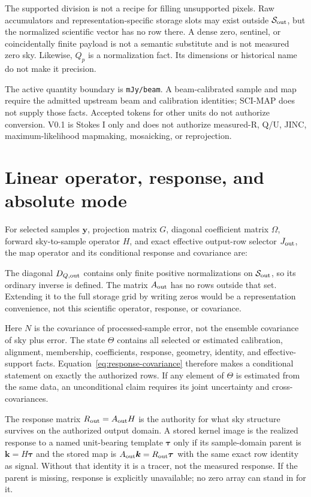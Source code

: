 \documentclass[10pt]{article}
\newcommand{\code}[1]{\nolinkurl{#1}}
\begin{document}
\SCIMapObservationEquations

The supported division is not a recipe for filling unsupported pixels. Raw
accumulators and representation-specific storage slots may exist outside
\(\mathcal S_{\rm out}\), but the normalized scientific vector has no row
there. A dense zero, sentinel, or coincidentally finite payload is not a
semantic substitute and is not measured zero sky. Likewise, \(Q_p\) is a
normalization fact. Its dimensions or historical name do not make it
precision.

The active quantity boundary is \code{mJy/beam}. A beam-calibrated sample and
map require the admitted upstream beam and calibration identities; SCI-MAP
does not supply those facts. Accepted tokens for other units do not authorize
conversion. V0.1 is Stokes I only and does not authorize measured-R,
Q/U, JINC, maximum-likelihood mapmaking, mosaicking, or reprojection.

\clearpage
\section{Linear operator, response, and absolute mode}

For selected samples \(\boldsymbol y\), projection matrix \(G\), diagonal
coefficient matrix \(\Omega\), forward sky-to-sample operator \(H\), and exact
effective output-row selector \(J_{\rm out}\), the map operator and its
conditional response and covariance are:

\SCIMapOperatorEquations

The diagonal \(D_{Q,{\rm out}}\) contains only finite positive normalizations
on \(\mathcal S_{\rm out}\), so its ordinary inverse is defined. The matrix
\(A_{\rm out}\) has no rows outside that set. Extending it to the full storage
grid by writing zeros would be a representation convenience, not this
scientific operator, response, or covariance.

Here \(N\) is the covariance of processed-sample error, not the ensemble
covariance of sky plus error. The state \(\Theta\) contains all selected or
estimated calibration, alignment, membership, coefficients, response,
geometry, identity, and effective-support facts.
Equation~\eqref{eq:response-covariance} therefore makes a conditional
statement on exactly the authorized rows. If any element of \(\Theta\) is
estimated from the same data, an unconditional claim requires its joint
uncertainty and cross-covariances.

The response matrix \(R_{\rm out}=A_{\rm out}H\) is the authority for what sky
structure survives on the authorized output domain.
A stored kernel image is the realized response to a named unit-bearing
template \(\boldsymbol\tau\) only if its sample-domain parent is
\(\boldsymbol k=H\boldsymbol\tau\) and the stored map is
\(A_{\rm out}\boldsymbol k=R_{\rm out}\boldsymbol\tau\) with the same exact row
identity as signal. Without that identity it is a tracer, not the measured
response. If the parent is missing, response is explicitly unavailable; no
zero array can stand in for it.
\end{document}
